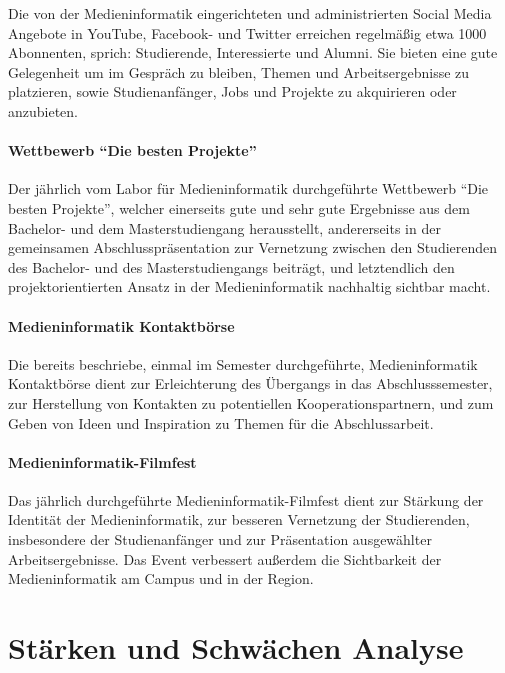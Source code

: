 Die von der Medieninformatik eingerichteten und administrierten Social
Media Angebote in YouTube, Facebook- und Twitter erreichen regelmäßig
etwa 1000 Abonnenten, sprich: Studierende, Interessierte und Alumni. Sie
bieten eine gute Gelegenheit um im Gespräch zu bleiben, Themen und
Arbeitsergebnisse zu platzieren, sowie Studienanfänger, Jobs und
Projekte zu akquirieren oder anzubieten.

\paragraph{\texorpdfstring{Wettbewerb ``Die besten
Projekte''}{Wettbewerb Die besten Projekte}}\label{wettbewerb-die-besten-projekte}

Der jährlich vom Labor für Medieninformatik durchgeführte Wettbewerb
``Die besten Projekte'', welcher einerseits gute und sehr gute
Ergebnisse aus dem Bachelor- und dem Masterstudiengang herausstellt,
andererseits in der gemeinsamen Abschlusspräsentation zur Vernetzung
zwischen den Studierenden des Bachelor- und des Masterstudiengangs
beiträgt, und letztendlich den projektorientierten Ansatz in der
Medieninformatik nachhaltig sichtbar macht.

\paragraph{Medieninformatik
Kontaktbörse}\label{medieninformatik-kontaktbuxf6rse}

Die bereits beschriebe, einmal im Semester durchgeführte,
Medieninformatik Kontaktbörse dient zur Erleichterung des Übergangs in
das Abschlusssemester, zur Herstellung von Kontakten zu potentiellen
Kooperationspartnern, und zum Geben von Ideen und Inspiration zu Themen
für die Abschlussarbeit.

\paragraph{Medieninformatik-Filmfest}\label{medieninformatik-filmfest}

Das jährlich durchgeführte Medieninformatik-Filmfest dient zur Stärkung
der Identität der Medieninformatik, zur besseren Vernetzung der
Studierenden, insbesondere der Studienanfänger und zur Präsentation
ausgewählter Arbeitsergebnisse. Das Event verbessert außerdem die
Sichtbarkeit der Medieninformatik am Campus und in der Region.

\section{Stärken und Schwächen
Analyse}\label{stuxe4rken-und-schwuxe4chen-analyse}

